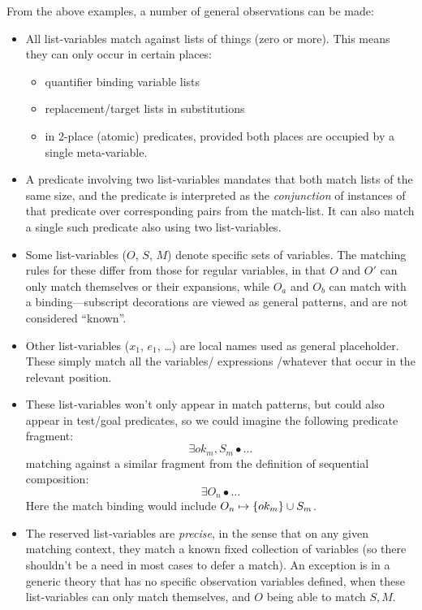 From the above examples,
a number of general observations can be made:
\begin{itemize}
  \item
    All list-variables match against lists of things (zero or more).
    This means they can only occur in certain places:
    \begin{itemize}
      \item quantifier binding variable lists
      \item replacement/target lists in substitutions
       \item in 2-place (atomic) predicates, provided both places
        are occupied by a single meta-variable.
    \end{itemize}
  \item
    A predicate involving two list-variables mandates that both
    match lists of the same size, and the predicate
    is interpreted as the \emph{conjunction} of instances of that predicate
    over corresponding pairs from the match-list.
    It can also match a single such predicate also using two list-variables.
  \item
    Some list-variables ($O$, $S$, $M$)
    denote specific sets of variables.
    The matching rules for these differ from those for regular variables,
    in that $O$ and $O'$ can only match themselves or their expansions,
    while $O_a$ and $O_b$ can match with a binding---subscript decorations
    are viewed as general patterns, and are not considered ``known''.
  \item
    Other list-variables  ($x_1$, $e_1$, \ldots)
    are local names used as general placeholder.
    These simply match all the variables/ expressions /whatever
    that occur in the relevant position.
  \item
    These list-variables won't only appear in match patterns,
    but could also appear in test/goal predicates,
    so we could imagine the following predicate fragment:
    $$
       \exists ok_m,S_m \bullet \ldots
    $$
    matching against a similar fragment from the definition of
    sequential composition:
    $$
      \exists O_n \bullet \ldots
    $$
    Here the match binding would include
    $O_n \mapsto \{{ok_m}\} \cup S_m$.
  \item
    The reserved list-variables are \emph{precise},
    in the sense that on any given matching context,
    they match a known fixed collection of variables
    (so there shouldn't be a need in most cases to defer a match).
    An exception is in a generic theory that has no specific observation
    variables defined, when these list-variables can only match
    themselves, and $O$ being able to match $S,M$.
\end{itemize}
